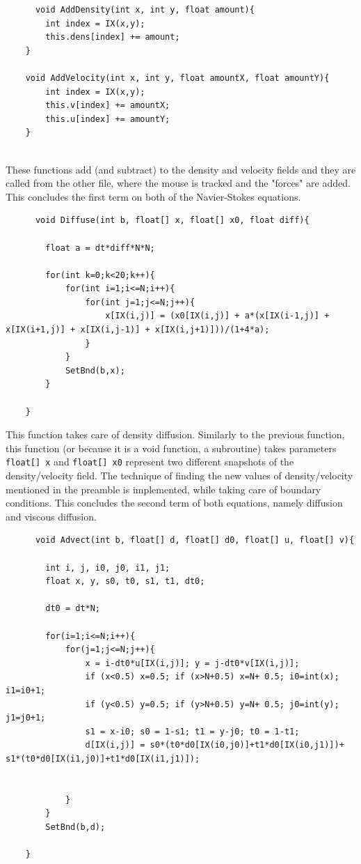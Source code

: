 \documentclass[12pt,a4paper]{book}
\begin{document}
\begin{lstlisting}
	  void AddDensity(int x, int y, float amount){
		int index = IX(x,y);
		this.dens[index] += amount;
	}
	
	void AddVelocity(int x, int y, float amountX, float amountY){
		int index = IX(x,y);
		this.v[index] += amountX;
		this.u[index] += amountY;
	}
	
\end{lstlisting}
These functions add (and subtract) to the density and velocity fields and they are called from the other file, where the mouse is tracked and the "forces" are added. This concludes the first term on both of the Navier-Stokes equations.
\begin{lstlisting}
	  void Diffuse(int b, float[] x, float[] x0, float diff){
		
		float a = dt*diff*N*N;
		
		for(int k=0;k<20;k++){
			for(int i=1;i<=N;i++){
				for(int j=1;j<=N;j++){
					x[IX(i,j)] = (x0[IX(i,j)] + a*(x[IX(i-1,j)] + x[IX(i+1,j)] + x[IX(i,j-1)] + x[IX(i,j+1)]))/(1+4*a);
				}
			}
			SetBnd(b,x);
		}
		
	}
\end{lstlisting}
This function takes care of density diffusion. Similarly to the previous function, this function (or because it is a void function, a subroutine) takes parameters \verb|float[] x| and \verb|float[] x0| represent two different snapshots of the density/velocity field. The technique of finding the new values of density/velocity mentioned in the preamble is implemented, while taking care of boundary conditions. This concludes the second term of both equations, namely diffusion and viscous diffusion.
\begin{lstlisting}
	  void Advect(int b, float[] d, float[] d0, float[] u, float[] v){
		
		int i, j, i0, j0, i1, j1;
		float x, y, s0, t0, s1, t1, dt0;
		
		dt0 = dt*N;
		
		for(i=1;i<=N;i++){
			for(j=1;j<=N;j++){
				x = i-dt0*u[IX(i,j)]; y = j-dt0*v[IX(i,j)];
				if (x<0.5) x=0.5; if (x>N+0.5) x=N+ 0.5; i0=int(x); i1=i0+1;
				if (y<0.5) y=0.5; if (y>N+0.5) y=N+ 0.5; j0=int(y); j1=j0+1;
				s1 = x-i0; s0 = 1-s1; t1 = y-j0; t0 = 1-t1;
				d[IX(i,j)] = s0*(t0*d0[IX(i0,j0)]+t1*d0[IX(i0,j1)])+ s1*(t0*d0[IX(i1,j0)]+t1*d0[IX(i1,j1)]);
				
				
			}
		}
		SetBnd(b,d);
		
	}
\end{lstlisting}
\end{document}
